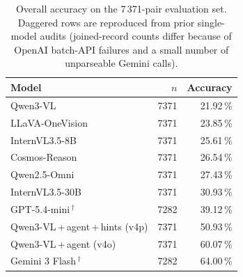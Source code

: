 \documentclass[11pt,a4paper]{article}
\newcommand{\pct}[1]{#1\,\%}
\begin{document}
\begin{table}[h]
\centering
\begin{tabular}{lrr}
\toprule
Model & $n$ & Accuracy \\
\midrule
Qwen3-VL                         & 7371 & \pct{21.92} \\
LLaVA-OneVision                  & 7371 & \pct{23.85} \\
InternVL3.5-8B                   & 7371 & \pct{25.61} \\
Cosmos-Reason                    & 7371 & \pct{26.54} \\
Qwen2.5-Omni                     & 7371 & \pct{27.43} \\
InternVL3.5-30B                  & 7371 & \pct{30.93} \\
GPT-5.4-mini\,$^\dagger$         & 7282 & \pct{39.12} \\
Qwen3-VL\,+\,agent\,+\,hints (v4p) & 7371 & \pct{50.93} \\
Qwen3-VL\,+\,agent (v4o)         & 7371 & \pct{60.07} \\
Gemini 3 Flash\,$^\dagger$       & 7282 & \pct{64.00} \\
\bottomrule
\end{tabular}
\caption{Overall accuracy on the 7\,371-pair evaluation set. Daggered
rows are reproduced from prior single-model audits (joined-record
counts differ because of OpenAI batch-API failures and a small number
of unparseable Gemini calls).}
\label{tab:overall}
\end{table}
\end{document}
